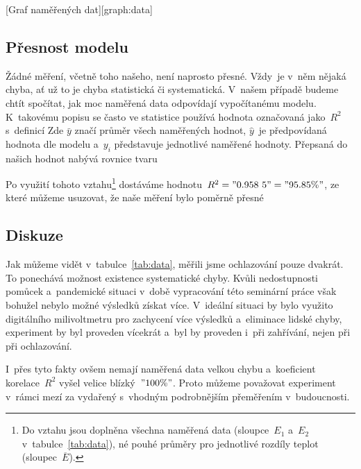 [Graf naměřených dat][graph:data]


\subsection{Přesnost modelu}
Žádné měření, včetně toho našeho, není naprosto přesné. Vždy~je v~něm nějaká chyba,
ať už to je chyba statistická či systematická. V~našem případě budeme chtít 
spočítat, jak moc naměřená data odpovídají vypočítanému modelu. K~takovému
popisu se často ve statistice používá hodnota označovaná jako~$R^2$ s~definicí
Zde $\bar y$ značí průměr všech naměřených hodnot, $\hat y$~je předpovídaná
hodnota dle modelu a~$y_i$ představuje jednotlivé naměřené hodnoty. Přepsaná do
našich hodnot nabývá rovnice tvaru

Po využití tohoto vztahu\footnote{Do vztahu jsou doplněna všechna naměřená data
(sloupce~$E_1$ a~$E_2$ v~tabulce~\ref{tab:data}), né pouhé průměry pro
jednotlivé rozdíly teplot (sloupec~$\overline{E}$).} dostáváme 
hodnotu~$R^2 = "0.958~5" = "95.85 \%"$, ze které můžeme usuzovat, že naše 
měření bylo poměrně přesné

\subsection{Diskuze}
Jak můžeme vidět v~tabulce~\ref{tab:data}, měřili jsme ochlazování pouze
dvakrát. To ponechává možnost existence systematické chyby. Kvůli nedostupnosti
pomůcek a~pandemické situaci v~době vypracování této seminární
práce však bohužel nebylo možné výsledků získat více. V~ideální situaci by bylo využito
digitálního milivoltmetru pro zachycení více výsledků a~eliminace lidské chyby,
experiment by byl proveden vícekrát a~byl by proveden i~při zahřívání, nejen při
při ochlazování.

I~přes tyto fakty ovšem nemají naměřená data velkou chybu a~koeficient
korelace~$R^2$ vyšel velice blízký~$"100 \%"$. Proto můžeme považovat
experiment v~rámci mezí za vydařený s~vhodným podrobnějším přeměřením
v~budoucnosti.
